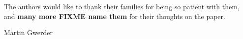 \documentclass[9pt,journal,compsoc]{IEEEtran}
\begin{document}
The authors would like to thank their families for being so patient with them, and \textbf{many more FIXME name them} for their thoughts on the paper.


\ifCLASSOPTIONcaptionsoff
  \newpage
\fi







%
%
%
%

% 
\ifCLASSOPTIONpeerreview
\else
\vfill
\begin{IEEEbiography}{Martin Gwerder}

\end{IEEEbiography}
\fi
\end{document}

